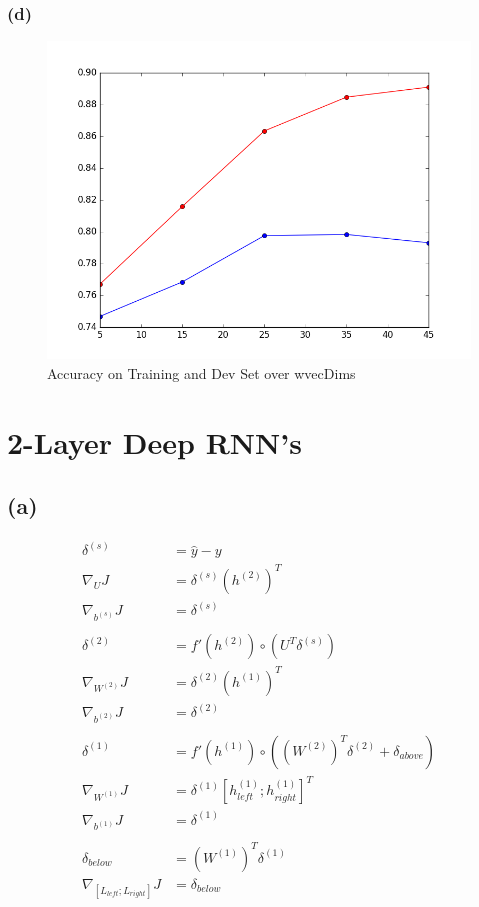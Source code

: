 \documentclass {article}
\begin{document}
\subsubsection*{(d)}
\begin{figure}[H]
\centering
\includegraphics[width=0.7\linewidth]{ps3_1_c_d}
\caption{Accuracy on Training and Dev Set over wvecDims}
\label{fig:ps3_1_c_d}
\end{figure}
\newpage

\section{2-Layer Deep RNN's}
\subsection*{(a)}
\begin{align*}
\delta^{(s)} &= \hat{y} - y \\
\nabla_U J &= \delta^{(s)} (h^{(2)})^T \\
\nabla_{b^{(s)}} J &= \delta^{(s)} \\
\\
\delta^{(2)} &= f'(h^{(2)}) \circ (U^T \delta^{(s)}) \\
\nabla_{W^{(2)}} J &= \delta^{(2)} (h^{(1)})^T \\
\nabla_{b^{(2)}} J &= \delta^{(2)} \\
\\
\delta^{(1)} &= f'(h^{(1)}) \circ (({W^{(2)}})^T \delta^{(2)} + \delta_{above}) \\
\nabla_{W^{(1)}} J &= \delta^{(1)} \left[h^{(1)}_{left}; h^{(1)}_{right} \right]^T \\
\nabla_{b^{(1)}} J &= \delta^{(1)} \\
\\
\delta_{below} &= (W^{(1)})^T \delta^{(1)} \\
\nabla_{[L_{left}; L_{right}]} J &= \delta_{below}
\end{align*}
\end{document}
